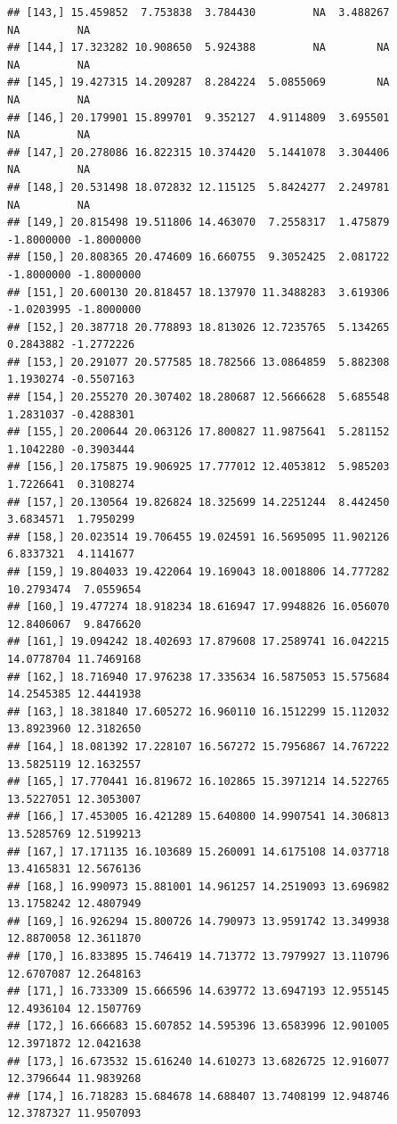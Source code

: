 \documentclass{article}\usepackage[]{graphicx}\usepackage[]{color}
\makeatletter
\newenvironment{kframe}{%
 \def\at@end@of@kframe{}%
 \ifinner\ifhmode%
  \def\at@end@of@kframe{\end{minipage}}%
  \begin{minipage}{\columnwidth}%
 \fi\fi%
 \def\FrameCommand##1{\hskip\@totalleftmargin \hskip-\fboxsep
 \colorbox{shadecolor}{##1}\hskip-\fboxsep
     \hskip-\linewidth \hskip-\@totalleftmargin \hskip\columnwidth}%
 \MakeFramed {\advance\hsize-\width
   \@totalleftmargin\z@ \linewidth\hsize
   \@setminipage}}%
 {\par\unskip\endMakeFramed%
 \at@end@of@kframe}
\newenvironment{knitrout}{}{} %
\makeatother
\begin{document}
\begin{knitrout}
\begin{kframe}
\begin{verbatim}
## [143,] 15.459852  7.753838  3.784430         NA  3.488267         NA         NA
## [144,] 17.323282 10.908650  5.924388         NA        NA         NA         NA
## [145,] 19.427315 14.209287  8.284224  5.0855069        NA         NA         NA
## [146,] 20.179901 15.899701  9.352127  4.9114809  3.695501         NA         NA
## [147,] 20.278086 16.822315 10.374420  5.1441078  3.304406         NA         NA
## [148,] 20.531498 18.072832 12.115125  5.8424277  2.249781         NA         NA
## [149,] 20.815498 19.511806 14.463070  7.2558317  1.475879 -1.8000000 -1.8000000
## [150,] 20.808365 20.474609 16.660755  9.3052425  2.081722 -1.8000000 -1.8000000
## [151,] 20.600130 20.818457 18.137970 11.3488283  3.619306 -1.0203995 -1.8000000
## [152,] 20.387718 20.778893 18.813026 12.7235765  5.134265  0.2843882 -1.2772226
## [153,] 20.291077 20.577585 18.782566 13.0864859  5.882308  1.1930274 -0.5507163
## [154,] 20.255270 20.307402 18.280687 12.5666628  5.685548  1.2831037 -0.4288301
## [155,] 20.200644 20.063126 17.800827 11.9875641  5.281152  1.1042280 -0.3903444
## [156,] 20.175875 19.906925 17.777012 12.4053812  5.985203  1.7226641  0.3108274
## [157,] 20.130564 19.826824 18.325699 14.2251244  8.442450  3.6834571  1.7950299
## [158,] 20.023514 19.706455 19.024591 16.5695095 11.902126  6.8337321  4.1141677
## [159,] 19.804033 19.422064 19.169043 18.0018806 14.777282 10.2793474  7.0559654
## [160,] 19.477274 18.918234 18.616947 17.9948826 16.056070 12.8406067  9.8476620
## [161,] 19.094242 18.402693 17.879608 17.2589741 16.042215 14.0778704 11.7469168
## [162,] 18.716940 17.976238 17.335634 16.5875053 15.575684 14.2545385 12.4441938
## [163,] 18.381840 17.605272 16.960110 16.1512299 15.112032 13.8923960 12.3182650
## [164,] 18.081392 17.228107 16.567272 15.7956867 14.767222 13.5825119 12.1632557
## [165,] 17.770441 16.819672 16.102865 15.3971214 14.522765 13.5227051 12.3053007
## [166,] 17.453005 16.421289 15.640800 14.9907541 14.306813 13.5285769 12.5199213
## [167,] 17.171135 16.103689 15.260091 14.6175108 14.037718 13.4165831 12.5676136
## [168,] 16.990973 15.881001 14.961257 14.2519093 13.696982 13.1758242 12.4807949
## [169,] 16.926294 15.800726 14.790973 13.9591742 13.349938 12.8870058 12.3611870
## [170,] 16.833895 15.746419 14.713772 13.7979927 13.110796 12.6707087 12.2648163
## [171,] 16.733309 15.666596 14.639772 13.6947193 12.955145 12.4936104 12.1507769
## [172,] 16.666683 15.607852 14.595396 13.6583996 12.901005 12.3971872 12.0421638
## [173,] 16.673532 15.616240 14.610273 13.6826725 12.916077 12.3796644 11.9839268
## [174,] 16.718283 15.684678 14.688407 13.7408199 12.948746 12.3787327 11.9507093

\end{verbatim}
\end{kframe}
\end{knitrout}
\end{document}
